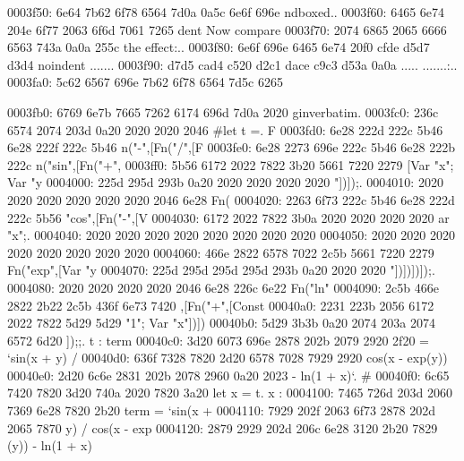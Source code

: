 \begin{bo
00010e0: 7865 647d 5c62 6567 696e 7b76 6572 6261  xed}
\begin{verba
00010f0: 7469 6d7d 0a20 2023 7479 7065 2074 6572  tim}
\begin{
0001c40: 7665 7262 6174 696d 7d0a 2020 236c 6574  verbatim}
\begin{boxe
00027a0: 647d 5c62 6567 696e 7b76 6572 6261 7469  d}
\begin{verbati
00027b0: 6d7d 0a20 2023 6c65 7420 696e 6669 7865  m}
\begin{v
0002c60: 6572 6261 7469 6d7d 0a20 2023 6c65 7420  erbatim}
\begin{
0002dc0: 7665 7262 6174 696d 7d0a 2020 236c 6574  verbatim}
\begin{boxed
0002f30: 7d5c 6265 6769 6e7b 7665 7262 6174 696d  }
\begin{verbatim
0002f40: 7d0a 2020 236c 6574 2068 6428 683a 3a74  }
\begin{v
0003e60: 6572 6261 7469 6d7d 0a20 2023 236f 7065  erbatim}
0003f50: 6e64 7b62 6f78 6564 7d0a 0a5c 6e6f 696e  nd{boxed}..\noin
0003f60: 6465 6e74 204e 6f77 2063 6f6d 7061 7265  dent Now compare
0003f70: 2074 6865 2065 6666 6563 743a 0a0a 255c   the effect:..%
0003f80: 6e6f 696e 6465 6e74 20f0 cfde d5d7 d3d4  noindent .......
0003f90: d7d5 cad4 c520 d2c1 dace c9c3 d53a 0a0a  ..... .......:..
0003fa0: 5c62 6567 696e 7b62 6f78 6564 7d5c 6265  \begin{boxed}\be
0003fb0: 6769 6e7b 7665 7262 6174 696d 7d0a 2020  gin{verbatim}.  
0003fc0: 236c 6574 2074 203d 0a20 2020 2020 2046  #let t =.      F
0003fd0: 6e28 222d 222c 5b46 6e28 222f 222c 5b46  n("-",[Fn("/",[F
0003fe0: 6e28 2273 696e 222c 5b46 6e28 222b 222c  n("sin",[Fn("+",
0003ff0: 5b56 6172 2022 7822 3b20 5661 7220 2279  [Var "x"; Var "y
0004000: 225d 295d 293b 0a20 2020 2020 2020 2020  "])]);.         
0004010: 2020 2020 2020 2020 2020 2020 2046 6e28               Fn(
0004020: 2263 6f73 222c 5b46 6e28 222d 222c 5b56  "cos",[Fn("-",[V
0004030: 6172 2022 7822 3b0a 2020 2020 2020 2020  ar "x";.        
0004040: 2020 2020 2020 2020 2020 2020 2020 2020                  
0004050: 2020 2020 2020 2020 2020 2020 2020 2020                  
0004060: 466e 2822 6578 7022 2c5b 5661 7220 2279  Fn("exp",[Var "y
0004070: 225d 295d 295d 295d 293b 0a20 2020 2020  "])])])]);.     
0004080: 2020 2020 2020 2020 2046 6e28 226c 6e22           Fn("ln"
0004090: 2c5b 466e 2822 2b22 2c5b 436f 6e73 7420  ,[Fn("+",[Const 
00040a0: 2231 223b 2056 6172 2022 7822 5d29 5d29  "1"; Var "x"])])
00040b0: 5d29 3b3b 0a20 2074 203a 2074 6572 6d20  ]);;.  t : term 
00040c0: 3d20 6073 696e 2878 202b 2079 2920 2f20  = `sin(x + y) / 
00040d0: 636f 7328 7820 2d20 6578 7028 7929 2920  cos(x - exp(y)) 
00040e0: 2d20 6c6e 2831 202b 2078 2960 0a20 2023  - ln(1 + x)`.  #
00040f0: 6c65 7420 7820 3d20 740a 2020 7820 3a20  let x = t.  x : 
0004100: 7465 726d 203d 2060 7369 6e28 7820 2b20  term = `sin(x + 
0004110: 7929 202f 2063 6f73 2878 202d 2065 7870  y) / cos(x - exp
0004120: 2879 2929 202d 206c 6e28 3120 2b20 7829  (y)) - ln(1 + x)

\end{boxed}
\end{v
0003e60: 6572 6261 7469 6d7d 0a20 2023 236f 7065  erbatim}
\end{verbatim
0002f40: 7d0a 2020 236c 6574 2068 6428 683a 3a74  }
\end{boxed
0002f30: 7d5c 6265 6769 6e7b 7665 7262 6174 696d  }
\end{
0002dc0: 7665 7262 6174 696d 7d0a 2020 236c 6574  verbatim}
\end{v
0002c60: 6572 6261 7469 6d7d 0a20 2023 6c65 7420  erbatim}
\end{verbati
00027b0: 6d7d 0a20 2023 6c65 7420 696e 6669 7865  m}
\end{boxe
00027a0: 647d 5c62 6567 696e 7b76 6572 6261 7469  d}
\end{
0001c40: 7665 7262 6174 696d 7d0a 2020 236c 6574  verbatim}
\end{verba
00010f0: 7469 6d7d 0a20 2023 7479 7065 2074 6572  tim}
\end{bo
00010e0: 7865 647d 5c62 6567 696e 7b76 6572 6261  xed}
